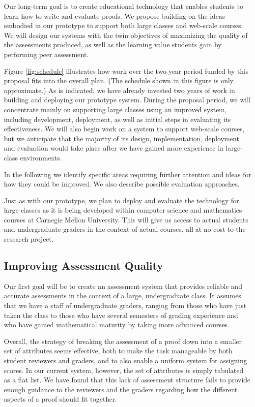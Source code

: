 \documentclass[12pt]{article}
\begin{document}
Our long-term goal is to create educational technology that enables
students to learn how to write and evaluate proofs.  We propose
building on the ideas embodied in our prototype to support both large
classes and web-scale courses.  We will design our systems with the
twin objectives of maximizing the quality of the assessments produced, as
well as the learning value students gain by performing peer assessment.

Figure \ref{fig:schedule} illustrates how work over the two-year
period funded by this proposal fits into the overall plan.  (The
schedule shown in this figure is only approximate.)  As is indicated,
we have already invested two years of work in building and deploying
our prototype system.  During the proposal period, we will concentrate
mainly on supporting large classes using an improved system, including
development, deployment, as well as initial steps in evaluating its
effectiveness.  We will also begin work on a system to support
web-scale courses, but we anticipate that the majority of its design,
implementation, deployment and evaluation would take place after we
have gained more experience in large-class environments.

In the following we identify specific areas requiring further
attention and ideas for how they could be improved.  We also describe
possible evaluation approaches.

Just as with our prototype, we plan to deploy and evaluate
the technology for large classes
as it is being developed within computer science and
mathematics courses at Carnegie Mellon University.  This will give us
access to actual students and undergraduate graders in the context of
actual courses, all at no cost to the research project.

\subsection{Improving Assessment Quality}

Our first goal will be to create an assessment system that provides
reliable and accurate assessments in the context of a large,
undergraduate class.  It assumes that we have a staff of undergraduate
graders, ranging from those who have just taken the class to those who
have several semesters of grading experience and who have gained
mathematical maturity by taking more advanced courses.

Overall, the strategy of breaking the assessment of a proof down into a smaller
set of attributes seems effective, both to make the task manageable by
both student reviewers and graders, and to also enable a uniform
system for assigning scores.  In our current system, however, the set
of attributes is simply tabulated as a flat list.  We have found that
this lack of assessment structure fails to provide enough guidance to the
reviewers and the graders regarding how the different aspects of a
proof should fit together.
\end{document}
